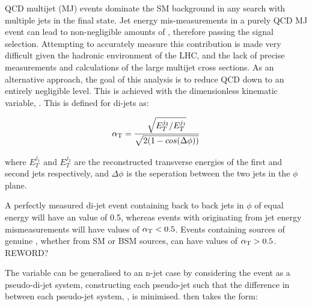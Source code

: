 QCD multijet (MJ) events dominate the SM background in any search with multiple jets 
in the final state. Jet energy mis-measurements in a 
purely QCD MJ event can lead to non-negligible amounts of \mht, therefore 
passing the signal selection. Attempting
to accurately measure this contribution is
made very difficult given the hadronic environment of the LHC, and the lack of 
precise measurements and calculations of the large multijet cross sections. As an 
alternative approach, the goal of this analysis is to reduce QCD down to an
entirely negligible level. This is 
achieved with the dimensionless kinematic variable, \alphat [REF]. This is defined
for di-jets as:

\begin{equation}
\alpha_{\text{T}} = \frac{ \sqrt{E_T^{j_2}/E_T^{j_1}} }{ \sqrt{2(1-cos(\Delta \phi))} }
\label{eq:alphat_di-jet}
\end{equation}

where $E_T^{j_1}$ and $E_T^{j_2}$ are the reconstructed transverse energies of 
the first and second jets respectively, and $\Delta \phi$ is the seperation 
between the two jets in the $\phi$ plane.

A perfectly measured di-jet event containing back to back jets in $\phi$ of equal energy will
have an \alphat value of 0.5, whereas 
events with \met originating from jet energy mismeasurements will have values of $\alpha_{\text{T}}<0.5$.
Events containing sources of genuine \met, whether from SM or BSM sources, can have values
of $\alpha_{\text{T}} > 0.5$. REWORD?





The \alphat variable can be generalised to an n-jet case by considering the event as a 
pseudo-di-jet system, constructing each pseudo-jet such that the difference in \HT
between each pseudo-jet system, \deltaHT, is minimised. \alphat then takes the 
form:

